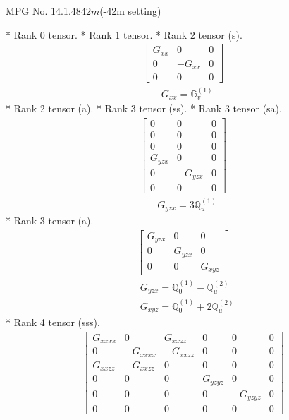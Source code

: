 \documentclass[fleqn,8pt,landscape]{jsarticle}
\begin{document}
\setcounter{MaxMatrixCols}{32}

\renewcommand{\tablename}{Table~}
\renewcommand{\figurename}{Figure~}
\begin{center}
\LARGE
MPG No. 14.1.48\quad$\bar{4}2m$\quad(-42m setting)
\end{center}
* Rank 0 tensor.
* Rank 1 tensor.
* Rank 2 tensor (s).
\begin{align*}
\begin{bmatrix} G_{xx} & 0 & 0 \\ 0 & - G_{xx} & 0 \\ 0 & 0 & 0 \end{bmatrix}
\end{align*}
\begin{align*}
& G_{xx} = \mathbb{G}_{v}^{(1)}
\end{align*}
* Rank 2 tensor (a).
* Rank 3 tensor (ss).
* Rank 3 tensor (sa).
\begin{align*}
\begin{bmatrix} 0 & 0 & 0 \\ 0 & 0 & 0 \\ 0 & 0 & 0 \\ G_{yzx} & 0 & 0 \\ 0 & - G_{yzx} & 0 \\ 0 & 0 & 0 \end{bmatrix}
\end{align*}
\begin{align*}
& G_{yzx} = 3 \mathbb{Q}_{u}^{(1)}
\end{align*}
* Rank 3 tensor (a).
\begin{align*}
\begin{bmatrix} G_{yzx} & 0 & 0 \\ 0 & G_{yzx} & 0 \\ 0 & 0 & G_{xyz} \end{bmatrix}
\end{align*}
\begin{align*}
& G_{yzx} = \mathbb{Q}_{0}^{(1)} - \mathbb{Q}_{u}^{(2)} \\
& G_{xyz} = \mathbb{Q}_{0}^{(1)} + 2 \mathbb{Q}_{u}^{(2)}
\end{align*}
* Rank 4 tensor (sss).
\begin{align*}
\begin{bmatrix} G_{xxxx} & 0 & G_{xxzz} & 0 & 0 & 0 \\ 0 & - G_{xxxx} & - G_{xxzz} & 0 & 0 & 0 \\ G_{xxzz} & - G_{xxzz} & 0 & 0 & 0 & 0 \\ 0 & 0 & 0 & G_{yzyz} & 0 & 0 \\ 0 & 0 & 0 & 0 & - G_{yzyz} & 0 \\ 0 & 0 & 0 & 0 & 0 & 0 \end{bmatrix}
\end{align*}
\end{document}
